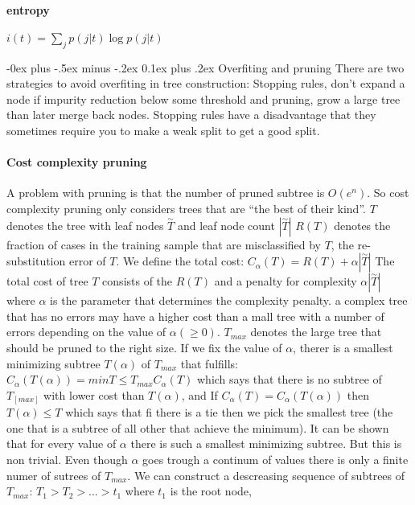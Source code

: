 \documentclass[8pt,landscape]{extarticle}
\makeatletter
\renewcommand{\subsubsection}{\@startsection{subsubsection}{3}{0mm}%
                                {-0ex plus -.5ex minus -.2ex}%
                                {0.1ex plus .2ex}%
                                {\normalfont\small\bfseries}}
\makeatother
\begin{document}
\begin{multicols}{3}
\paragraph{entropy}$i(t)=\sum_j p(j|t)\log p(j|t)$

\subsubsection{Overfiting and pruning}
There are two strategies to avoid overfiting in tree construction:
Stopping rules, don't expand a node if impurity reduction below some threshold
and pruning, grow a large tree than later merge back nodes.
Stopping rules have a disadvantage that they sometimes require you to make
a weak split to get a good split.
\paragraph{Cost complexity pruning}
A problem with pruning is that the number of pruned subtree is $O(e^n)$.
So cost complexity pruning only considers trees that are
``the best of their kind''.
$T$ denotes the tree with leaf nodes $\overset{\sim}{T}$  and leaf node count
$|\overset{\sim}{T}|$
$R(T)$ denotes the fraction of cases in the training sample that are
misclassified by $T$, the re-substitution error of $T$.
We define the total cost: $C_\alpha(T)=R(T)+\alpha |\overset{\sim}{T}|$
The total cost of tree $T$ consists of the $R(T)$ and a penalty for complexity
$\alpha|\overset{\sim}{T}|$ where $\alpha$ is the parameter that determines the
complexity penalty.
a complex tree that has no errors may have a higher cost than a mall tree with
a number of errors depending on the value of $\alpha (\geq 0)$.
$T_{max}$ denotes the large tree that should be pruned to the right size.
If we fix the value of $\alpha$, therer is a smallest minimizing subtree $T(\alpha)$
of $T_{max}$ that fulfills:
$C_\alpha(T(\alpha))=min T \leq T_{max} C_\alpha(T)$ which says that there is no
subtree of $T_[max]$ with lower cost than $T(\alpha)$, and
If $C_\alpha (T) = C_\alpha(T(\alpha))$ then $T(\alpha) \leq T$ which says that
fi there is a tie then we pick the smallest tree (the one that is a subtree of
all other that achieve the minimum).
It can be shown that for every value of $\alpha$ there is  such a smallest
minimizing subtree. But this is non trivial.
Even though $\alpha$ goes trough a continum of values there is only a finite
numer of sutrees of $T_{max}$. We can construct a descreasing sequence of
subtrees of $T_{max}$: $T_1 > T_2 > ... > {t_1} $ where $t_1$ is the root node,

\end{multicols}
\end{document}
